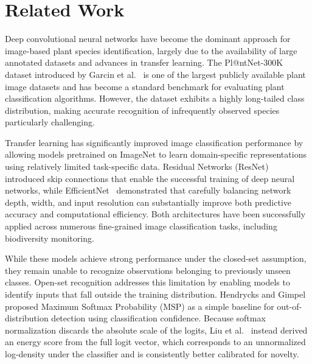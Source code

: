 \documentclass[11pt]{article}
\begin{document}
\section{Related Work}

Deep convolutional neural networks have become the dominant approach for image-based plant species identification, largely due to the availability of large annotated datasets and advances in transfer learning. The Pl@ntNet-300K dataset introduced by Garcin et al.~\cite{garcin2021plantnet} is one of the largest publicly available plant image datasets and has become a standard benchmark for evaluating plant classification algorithms. However, the dataset exhibits a highly long-tailed class distribution, making accurate recognition of infrequently observed species particularly challenging.

Transfer learning has significantly improved image classification performance by allowing models pretrained on ImageNet to learn domain-specific representations using relatively limited task-specific data. Residual Networks (ResNet)~\cite{he2016deep} introduced skip connections that enable the successful training of deep neural networks, while EfficientNet~\cite{tan2019efficientnet} demonstrated that carefully balancing network depth, width, and input resolution can substantially improve both predictive accuracy and computational efficiency. Both architectures have been successfully applied across numerous fine-grained image classification tasks, including biodiversity monitoring.

While these models achieve strong performance under the closed-set assumption, they remain unable to recognize observations belonging to previously unseen classes. Open-set recognition addresses this limitation by enabling models to identify inputs that fall outside the training distribution. Hendrycks and Gimpel~\cite{hendrycks2017baseline} proposed Maximum Softmax Probability (MSP) as a simple baseline for out-of-distribution detection using classification confidence. Because softmax normalization discards the absolute scale of the logits, Liu et al.~\cite{liu2020energy} instead derived an energy score from the full logit vector, which corresponds to an unnormalized log-density under the classifier and is consistently better calibrated for novelty.
\end{document}
